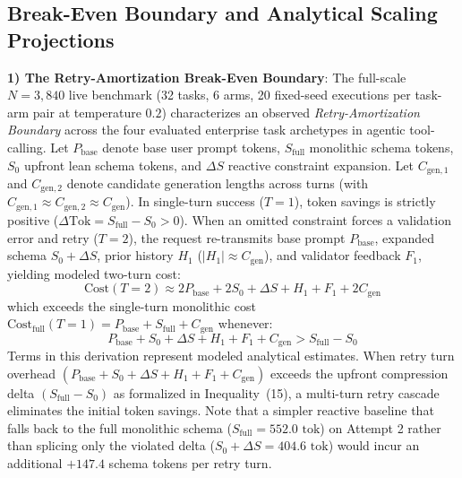 \subsection{Break-Even Boundary and Analytical Scaling Projections}
\noindent\textbf{1) The Retry-Amortization Break-Even Boundary}: The full-scale $N=3,840$ live benchmark (32 tasks, 6 arms, 20 fixed-seed executions per task-arm pair at temperature $0.2$) characterizes an observed \emph{Retry-Amortization Boundary} across the four evaluated enterprise task archetypes in agentic tool-calling. Let $P_{\text{base}}$ denote base user prompt tokens, $S_{\text{full}}$ monolithic schema tokens, $S_0$ upfront lean schema tokens, and $\Delta S$ reactive constraint expansion. Let $C_{\text{gen},1}$ and $C_{\text{gen},2}$ denote candidate generation lengths across turns (with $C_{\text{gen},1} \approx C_{\text{gen},2} \approx C_{\text{gen}}$).
In single-turn success ($T=1$), token savings is strictly positive ($\Delta \text{Tok} = S_{\text{full}} - S_0 > 0$). When an omitted constraint forces a validation error and retry ($T=2$), the request re-transmits base prompt $P_{\text{base}}$, expanded schema $S_0 + \Delta S$, prior history $H_1$ ($|H_1| \approx C_{\text{gen}}$), and validator feedback $F_1$, yielding modeled two-turn cost:
\begin{equation}
\label{eq:cost_t2}
\text{Cost}(T=2) \approx 2 P_{\text{base}} + 2 S_0 + \Delta S + H_1 + F_1 + 2 C_{\text{gen}}
\end{equation}
which exceeds the single-turn monolithic cost $\text{Cost}_{\text{full}}(T=1) = P_{\text{base}} + S_{\text{full}} + C_{\text{gen}}$ whenever:
\begin{equation}
P_{\text{base}} + S_0 + \Delta S + H_1 + F_1 + C_{\text{gen}} > S_{\text{full}} - S_0
\end{equation}
Terms in this derivation represent modeled analytical estimates. When retry turn overhead $(P_{\text{base}} + S_0 + \Delta S + H_1 + F_1 + C_{\text{gen}})$ exceeds the upfront compression delta $(S_{\text{full}} - S_0)$ as formalized in Inequality~(15), a multi-turn retry cascade eliminates the initial token savings. Note that a simpler reactive baseline that falls back to the full monolithic schema ($S_{\text{full}} = 552.0\text{ tok}$) on Attempt 2 rather than splicing only the violated delta ($S_0 + \Delta S = 404.6\text{ tok}$) would incur an additional $+147.4$ schema tokens per retry turn.

